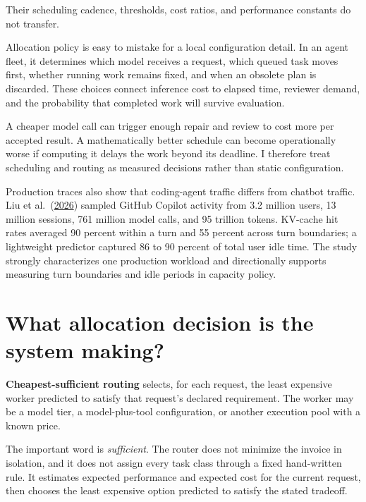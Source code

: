 Their scheduling cadence, thresholds, cost ratios, and performance constants do not transfer.

Allocation policy is easy to mistake for a local configuration detail. In an agent fleet, it determines which model receives a request, which queued task moves first, whether running work remains fixed, and when an obsolete plan is discarded. These choices connect inference cost to elapsed time, reviewer demand, and the probability that completed work will survive evaluation.

A cheaper model call can trigger enough repair and review to cost more per accepted result. A mathematically better schedule can become operationally worse if computing it delays the work beyond its deadline. I therefore treat scheduling and routing as measured decisions rather than static configuration.

Production traces also show that coding-agent traffic differs from chatbot traffic. Liu et al.~(\href{https://arxiv.org/abs/2608.00101}{2026}) sampled GitHub Copilot activity from 3.2 million users, 13 million sessions, 761 million model calls, and 95 trillion tokens. KV-cache hit rates averaged 90 percent within a turn and 55 percent across turn boundaries; a lightweight predictor captured 86 to 90 percent of total user idle time. The study strongly characterizes one production workload and directionally supports measuring turn boundaries and idle periods in capacity policy.

\hypertarget{what-allocation-decision-is-the-system-making}{%
\section{What allocation decision is the system making?}\label{what-allocation-decision-is-the-system-making}}

\textbf{Cheapest-sufficient routing} selects, for each request, the least expensive worker predicted to satisfy that request's declared requirement. The worker may be a model tier, a model-plus-tool configuration, or another execution pool with a known price.

The important word is \emph{sufficient}. The router does not minimize the invoice in isolation, and it does not assign every task class through a fixed hand-written rule. It estimates expected performance and expected cost for the current request, then chooses the least expensive option predicted to satisfy the stated tradeoff.


